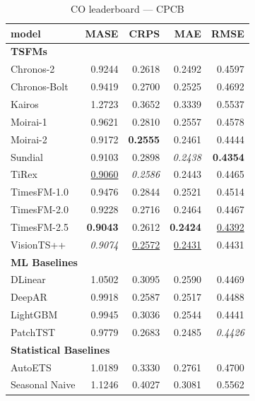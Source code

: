 \begin{table}[H]
\caption{CO leaderboard --- CPCB}
\centering
\begin{small}
\begin{tabular}{lrrrr}
\toprule
model & MASE & CRPS & MAE & RMSE \\
\midrule
\multicolumn{5}{l}{\textbf{TSFMs}} \\
Chronos-2 & 0.9244 & 0.2618 & 0.2492 & 0.4597 \\
Chronos-Bolt & 0.9419 & 0.2700 & 0.2525 & 0.4692 \\
Kairos & 1.2723 & 0.3652 & 0.3339 & 0.5537 \\
Moirai-1 & 0.9621 & 0.2810 & 0.2557 & 0.4578 \\
Moirai-2 & 0.9172 & \textbf{0.2555} & 0.2461 & 0.4444 \\
Sundial & 0.9103 & 0.2898 & \textit{0.2438} & \textbf{0.4354} \\
TiRex & \underline{0.9060} & \textit{0.2586} & 0.2443 & 0.4465 \\
TimesFM-1.0 & 0.9476 & 0.2844 & 0.2521 & 0.4514 \\
TimesFM-2.0 & 0.9228 & 0.2716 & 0.2464 & 0.4467 \\
TimesFM-2.5 & \textbf{0.9043} & 0.2612 & \textbf{0.2424} & \underline{0.4392} \\
VisionTS++ & \textit{0.9074} & \underline{0.2572} & \underline{0.2431} & 0.4431 \\
\midrule
\multicolumn{5}{l}{\textbf{ML Baselines}} \\
DLinear & 1.0502 & 0.3095 & 0.2590 & 0.4469 \\
DeepAR & 0.9918 & 0.2587 & 0.2517 & 0.4488 \\
LightGBM & 0.9945 & 0.3036 & 0.2544 & 0.4441 \\
PatchTST & 0.9779 & 0.2683 & 0.2485 & \textit{0.4426} \\
\midrule
\multicolumn{5}{l}{\textbf{Statistical Baselines}} \\
AutoETS & 1.0189 & 0.3330 & 0.2761 & 0.4700 \\
Seasonal Naive & 1.1246 & 0.4027 & 0.3081 & 0.5562 \\
\bottomrule
\end{tabular}
\end{small}
\end{table}